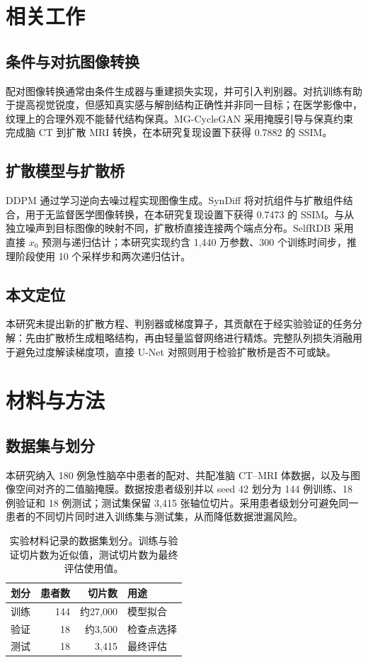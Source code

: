 \documentclass[UTF8,12pt,a4paper,twocolumn]{ctexart}
\begin{document}
\section{相关工作}
\subsection{条件与对抗图像转换}
配对图像转换通常由条件生成器与重建损失实现，并可引入判别器\cite{isola2017image}。对抗训练有助于提高视觉锐度，但感知真实感与解剖结构正确性并非同一目标；在医学影像中，纹理上的合理外观不能替代结构保真。MG-CycleGAN 采用掩膜引导与保真约束完成脑 CT 到扩散 MRI 转换\cite{khalil2025mask}，在本研究复现设置下获得 0.7882 的 SSIM。

\subsection{扩散模型与扩散桥}
DDPM 通过学习逆向去噪过程实现图像生成\cite{ho2020ddpm}。SynDiff 将对抗组件与扩散组件结合，用于无监督医学图像转换\cite{ozbey2023syndiff}，在本研究复现设置下获得 0.7473 的 SSIM。与从独立噪声到目标图像的映射不同，扩散桥直接连接两个端点分布。SelfRDB 采用直接 $x_0$ 预测与递归估计\cite{arslan2025selfrdb}；本研究实现约含 1,440 万参数、300 个训练时间步，推理阶段使用 10 个采样步和两次递归估计。

\subsection{本文定位}
本研究未提出新的扩散方程、判别器或梯度算子，其贡献在于经实验验证的任务分解：先由扩散桥生成粗略结构，再由轻量监督网络进行精炼。完整队列损失消融用于避免过度解读梯度项，直接 U-Net 对照则用于检验扩散桥是否不可或缺。

\section{材料与方法}
\subsection{数据集与划分}
本研究纳入 180 例急性脑卒中患者的配对、共配准脑 CT--MRI 体数据，以及与图像空间对齐的二值脑掩膜。数据按患者级别并以 seed 42 划分为 144 例训练、18 例验证和 18 例测试；测试集保留 3,415 张轴位切片。采用患者级划分可避免同一患者的不同切片同时进入训练集与测试集，从而降低数据泄漏风险。

\begin{table}[!t]\centering
\caption{实验材料记录的数据集划分。训练与验证切片数为近似值，测试切片数为最终评估使用值。}
\begin{tabular}{lrrl}\toprule
划分 & 患者数 & 切片数 & 用途\\\midrule
训练 & 144 & 约27,000 & 模型拟合\\验证 & 18 & 约3,500 & 检查点选择\\测试 & 18 & 3,415 & 最终评估\\\bottomrule
\end{tabular}\end{table}
\end{document}

